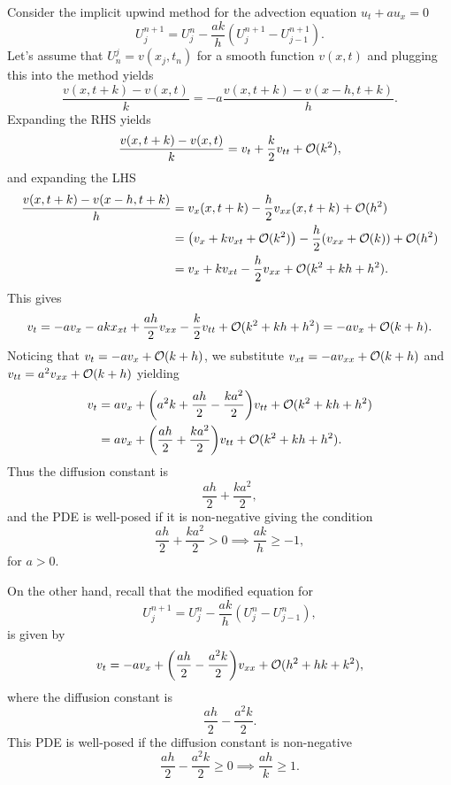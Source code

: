 \documentclass[12pt]{report}
\begin{document}
\begin{solution}

  \noindent
  Consider the implicit upwind method for the advection equation $u_t + a u_x = 0$
  \[
    U_{j}^{n+1} = U_{j}^n  - \frac{ak}{h} \left( U_j^{n+1} - U_{j-1}^{n+1} \right).
  \]
  Let's assume that $U^j_n = v(x_j,t_n)$ for a smooth function $v(x,t)$ and plugging this into the method yields
  \[ 
    \frac{v(x,t+k) - v(x,t)}{k} = -a \frac{v(x,t+k) - v(x-h,t+k)}{h}.
  \]
  Expanding the RHS yields
  \[
    \frac{v(x,t+k) - v(x,t)}{k} = v_t + \frac{k}{2}v_{tt} + {\mathcal{O}}(k^2),
  \]
  and expanding the LHS
  \begin{align*}
      \frac{v(x,t+k) - v(x-h,t+k)}{h} &= v_x(x,t+k) - \frac{h}{2}v_{xx}(x,t+k) + {\mathcal{O}}(h^2)\\
      &= {\left(v_x + kv_{xt} + {\mathcal{O}}(k^2)\right)} - \frac{h}{2}{\left(v_{xx} +{\mathcal{O}}(k)\right)}+ {\mathcal{O}}(h^2)\\
      &=v_x + kv_{xt} - \frac{h}{2}v_{xx} + {\mathcal{O}}(k^2 + kh + h^2).
  \end{align*}
  This gives
  \[
    v_t = -av_x - akx_{xt} + \frac{ah}{2}v_{xx} - \frac{k}{2}v_{tt}+ {\mathcal{O}}(k^2 + kh + h^2) = - av_x + {\mathcal{O}} (k +h).
  \] 
  Noticing that $v_t = -av_x + {\mathcal{O}}(k + h)$, we substitute $v_{xt} = - av_{xx} + {\mathcal{O}}(k + h)$ and $v_{tt} = a^2v_{xx} + {\mathcal{O}}(k + h)$ yielding
  \begin{align*}
    v_t &= av_x + {\left(a^2k + \frac{ah}{2} - \frac{ka^2}{2}\right)}v_{tt}+ {\mathcal{O}}(k^2 + kh + h^2)\\
    &= av_x + {\left(\frac{ah}{2} + \frac{ka^2}{2}\right)}v_{tt}+ {\mathcal{O}}(k^2 + kh + h^2).\\  
  \end{align*}
  Thus the diffusion constant is
  \[
    \frac{ah}{2} + \frac{ka^2}{2},
  \]
  and the PDE is well-posed if it is non-negative giving the condition
  \[
    \frac{ah}{2} + \frac{ka^2}{2} > 0 \implies \frac{ak}{h} \geq -1,
  \]
  for $a>0$. 
  
  \noindent
  On the other hand, recall that the modified equation for
  \[
    U_{j}^{n+1} = U_{j}^n  - \frac{ak}{h} \left( U_j^{n} - U_{j-1}^{n} \right),
  \]
  is given by
  \[
    v_{t} = -av_x + {\left(\frac{ah}{2} - \frac{a^2k}{2}\right)}v_{xx} + {\mathcal{O}}(h^2 + hk + k^2),
  \]
  where the diffusion constant is
  \[
    \frac{ah}{2} - \frac{a^2k}{2}.
  \]
  This PDE is well-posed if the diffusion constant is non-negative
  \[
    \frac{ah}{2} - \frac{a^2k}{2} \geq 0 \implies \frac{ah}{k} \geq 1.
  \]


\end{solution}
\end{document}
